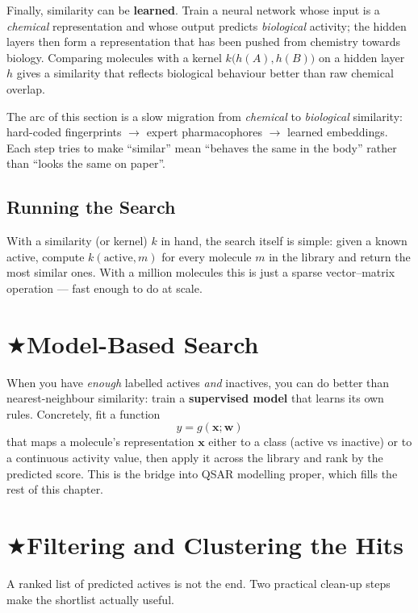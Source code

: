 \documentclass[11pt, oneside]{book}
\makeatletter
\newcommand{\starglyph}{\textcolor{stargold}{\ensuremath{\bigstar}}}
\newcommand{\starsec}[1]{%
  \texorpdfstring{\starglyph\hspace{0.4em}\textcolor{star@frame}{#1}}{#1}}
\newcommand{\weights}{\mathbf{w}}
\newcommand{\xvec}{\mathbf{x}}
\makeatother
\begin{document}
Finally, similarity can be \textbf{learned}. Train a neural network whose input is
a \emph{chemical} representation and whose output predicts \emph{biological}
activity; the hidden layers then form a representation that has been pushed from
chemistry towards biology. Comparing molecules with a kernel
$k\big(h(A), h(B)\big)$ on a hidden layer $h$ gives a similarity that reflects
biological behaviour better than raw chemical overlap.

\begin{intbox}
The arc of this section is a slow migration from \emph{chemical} to
\emph{biological} similarity: hard-coded fingerprints $\to$ expert pharmacophores
$\to$ learned embeddings. Each step tries to make ``similar'' mean ``behaves the
same in the body'' rather than ``looks the same on paper''.
\end{intbox}

\subsection{Running the Search}

With a similarity (or kernel) $k$ in hand, the search itself is simple: given a
known active, compute $k(\text{active}, m)$ for every molecule $m$ in the library
and return the most similar ones. With a million molecules this is just a sparse
vector--matrix operation --- fast enough to do at scale.

\section{\starsec{Model-Based Search}}

When you have \emph{enough} labelled actives \emph{and} inactives, you can do
better than nearest-neighbour similarity: train a \textbf{supervised model} that
learns its own rules. Concretely, fit a function
\[
  y = g(\xvec; \weights)
\]
that maps a molecule's representation $\xvec$ either to a class (active vs
inactive) or to a continuous activity value, then apply it across the library and
rank by the predicted score. This is the bridge into QSAR modelling proper, which
fills the rest of this chapter.

\newpage

\section{\starsec{Filtering and Clustering the Hits}}

A ranked list of predicted actives is not the end. Two practical clean-up steps
make the shortlist actually useful.
\end{document}
